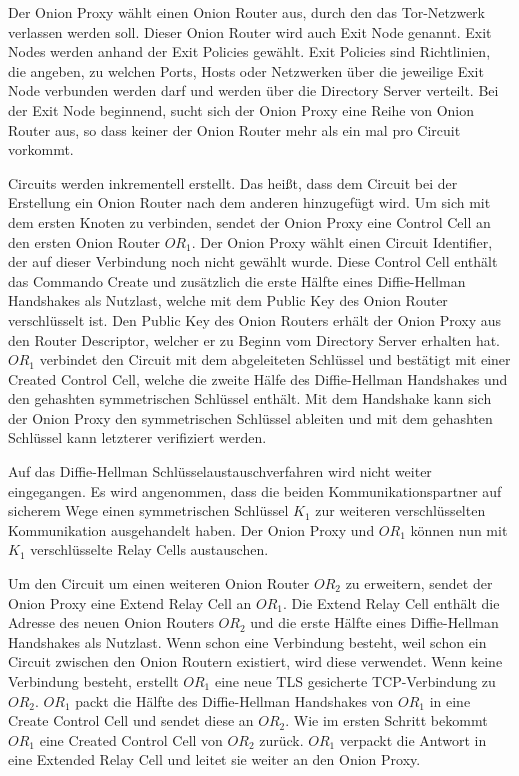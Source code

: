 \documentclass[fleqn,envcountsame,runningheads,10pt,a4paper]{llncs}
\begin{document}
Der Onion Proxy wählt einen Onion Router aus, durch den das Tor-Netzwerk 
verlassen werden soll. Dieser Onion Router wird auch Exit Node genannt. Exit 
Nodes werden anhand der Exit Policies gewählt. Exit Policies  sind Richtlinien, 
die angeben, zu welchen Ports, Hosts oder Netzwerken über die jeweilige Exit 
Node verbunden werden darf und werden über die Directory Server verteilt. Bei 
der Exit Node beginnend, sucht sich der Onion Proxy eine Reihe von Onion Router 
aus, so dass keiner der Onion Router mehr als ein mal pro Circuit vorkommt.

Circuits werden inkrementell erstellt. Das heißt, dass dem Circuit bei der 
Erstellung ein Onion Router nach dem anderen hinzugefügt wird. Um sich mit dem 
ersten Knoten zu verbinden, sendet der Onion Proxy eine Control Cell an den 
ersten Onion Router $\textit{OR}_1$. Der Onion Proxy wählt einen Circuit 
Identifier, der auf dieser Verbindung noch nicht gewählt wurde. Diese Control 
Cell enthält das Commando Create und zusätzlich die erste Hälfte eines 
Diffie-Hellman Handshakes als Nutzlast, welche mit dem Public Key des Onion 
Router verschlüsselt ist. Den Public Key des Onion Routers erhält der Onion 
Proxy aus den Router Descriptor, welcher er zu Beginn vom Directory Server 
erhalten hat. $\textit{OR}_1$ verbindet den Circuit mit dem abgeleiteten 
Schlüssel und  bestätigt mit einer Created Control Cell, welche die zweite Hälfe 
des Diffie-Hellman Handshakes und den gehashten symmetrischen Schlüssel enthält. 
Mit dem Handshake kann sich der Onion Proxy den symmetrischen Schlüssel ableiten 
und mit dem gehashten Schlüssel kann letzterer verifiziert werden.

Auf das Diffie-Hellman Schlüsselaustauschverfahren \cite{dh} wird nicht weiter 
eingegangen. Es wird angenommen, dass die beiden Kommunikationspartner auf 
sicherem Wege einen symmetrischen Schlüssel $K_1$ zur weiteren verschlüsselten 
Kommunikation ausgehandelt haben. Der Onion Proxy und $\textit{OR}_1$ können nun 
mit $K_1$ verschlüsselte Relay Cells austauschen. 

Um den Circuit um einen weiteren Onion Router $\textit{OR}_2$ zu erweitern, 
sendet der Onion Proxy eine Extend Relay Cell an $\textit{OR}_1$. Die Extend 
Relay Cell enthält die Adresse des neuen Onion Routers $\textit{OR}_2$ und die 
erste Hälfte eines Diffie-Hellman Handshakes als Nutzlast. Wenn schon eine 
Verbindung besteht, weil schon ein Circuit zwischen den Onion Routern existiert, 
wird diese verwendet. Wenn keine Verbindung besteht, erstellt $\textit{OR}_1$ 
eine neue TLS\cite{rfc:tls} gesicherte TCP-Verbindung zu $\textit{OR}_2$. 
$\textit{OR}_1$ packt die Hälfte des Diffie-Hellman Handshakes von 
$\textit{OR}_1$ in eine Create Control Cell und sendet diese an $\textit{OR}_2$. 
Wie im ersten Schritt bekommt $\textit{OR}_1$ eine Created Control Cell von 
$\textit{OR}_2$ zurück. $\textit{OR}_1$ verpackt die Antwort in eine Extended 
Relay Cell und leitet sie weiter an den Onion Proxy.
\end{document}
